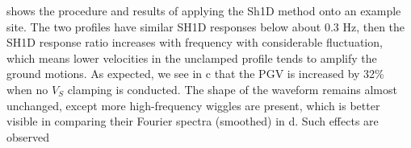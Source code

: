  shows the procedure and results of applying the Sh1D method onto an example site. The two profiles have similar SH1D responses below about 0.3 Hz, then the SH1D response ratio increases with frequency with considerable fluctuation, which means lower velocities in the unclamped profile tends to amplify the ground motions. As expected, we see in c that the PGV is increased by 32\% when no $V_S$ clamping is conducted. The shape of the waveform remains almost unchanged, except more high-frequency wiggles are present, which is better visible in comparing their Fourier spectra (smoothed) in d. Such effects are observed



